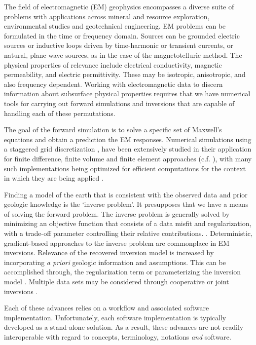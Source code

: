 \documentclass[preprint,review,3p,times,onecolumn,authoryear]{elsarticle}
\begin{document}
The field of electromagnetic (EM) geophysics encompasses a diverse suite of
problems with applications across mineral and resource exploration,
environmental studies and geotechnical engineering. EM problems can be
formulated in the time or frequency domain. Sources can be grounded electric
sources or inductive loops driven by time-harmonic or transient currents, or
natural, plane wave sources, as in the case of the magnetotelluric method. The
physical properties of relevance include electrical conductivity, magnetic
permeability, and electric permittivity. These may be  isotropic, anisotropic,
and also frequency dependent. Working with electromagnetic data to discern
information about subsurface physical properties requires that we have
numerical tools for carrying out forward simulations and inversions that are
capable of handling each of these permutations.


The goal of the forward simulation is to solve a specific set of Maxwell's
equations and obtain a prediction the EM responses. Numerical simulations
using a staggered grid discretization \citep{Yee1966}, have been extensively
studied in their application for finite difference, finite volume and finite
element approaches (c.f. \cite{newman1999, Haber2014a}), with many such
implementations being optimized for efficient computations for the context in
which they are being applied \citep{Haber2001, Key2007,  Kelbert2014,
Yang2014}.


Finding a model of the earth that is consistent with the observed data and
prior geologic knowledge is the `inverse problem'. It presupposes
that we have a means of solving the forward problem. The inverse problem is
generally solved by minimizing an  objective function that consists of a data
misfit and regularization, with a trade-off parameter controlling their
relative contributions. \citep{Tikhonov1977, Parker1980, Constable1987}.
Deterministic, gradient-based approaches to the inverse problem are
commonplace in EM inversions.   Relevance of the recovered inversion model is
increased by incorporating \emph{a priori} geologic information and
assumptions. This can be accomplished through, the regularization term
\citep{OldenburgTutorial, Constable1987} or parameterizing the inversion model
\citep{Pidlisecky2011, McMillan2015a, Kang2015}. Multiple data sets may be
considered through cooperative or joint inversions \citep{Haber1998,
McMillan2015}.

Each of these advances relies on a workflow and associated software
implementation. Unfortunately, each software implementation is typically developed as a stand-alone
solution. As a result, these advances are not readily interoperable with
regard to concepts, terminology, notations \emph{and} software.
\end{document}
